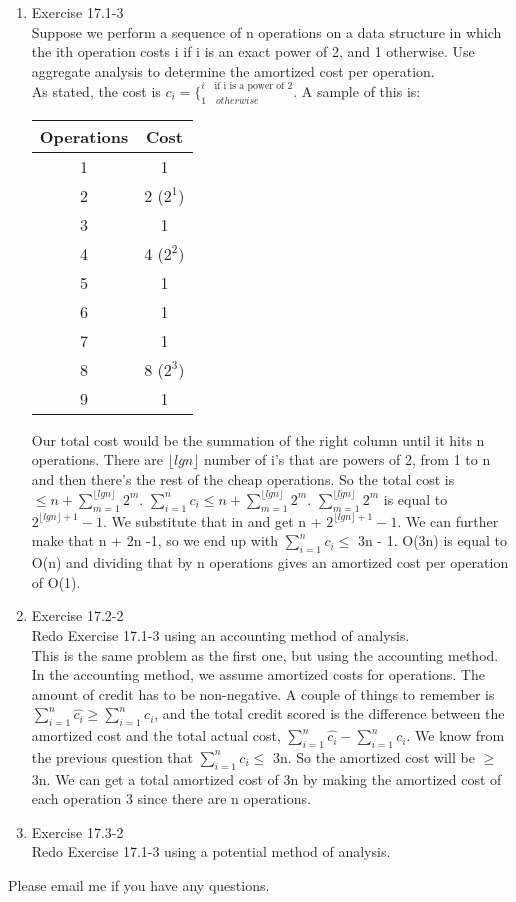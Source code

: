 \documentclass[12pt]{article}
\begin{document}
\begin{enumerate}
\item Exercise 17.1-3 \\
Suppose we perform a sequence of n operations on a data structure in which the ith operation costs i if i is an exact power of 2, and 1 otherwise. Use aggregate analysis to determine the amortized cost per operation. \\
As stated, the cost is $c_i=\{^{i\quad \textrm{if i is a power of 2}}_{1\quad otherwise}$. A sample of this is:
\begin{center}
 \begin{tabular}{|c c|} 
 \hline
 Operations & Cost\\ [0.5ex] 
 \hline
 1 & 1 \\ 
 \hline
 2 & 2 ($2^1$)  \\
 \hline
 3 & 1 \\
 \hline
 4 & 4 ($2^2$)\\
 \hline
 5 & 1 \\
 \hline
 6 & 1  \\ 
 \hline
 7 & 1 \\ 
 \hline
 8 & 8 ($2^3$)\\
 \hline
 9 & 1  \\
 \hline
\end{tabular}
\end{center}
Our total cost would be the summation of the right column until it hits n operations. There are $\lfloor lgn \rfloor$ number of i's that are powers of 2, from 1 to n and then there's the rest of the cheap operations. So the total cost is $\leq n + \sum_{m=1}^{\lfloor lgn \rfloor}2^m$. $\sum_{i=1}^nc_i \leq n + \sum_{m=1}^{\lfloor lgn \rfloor}2^m$. $\sum_{m=1}^{\lfloor lgn \rfloor}2^m$ is equal to $2^{\lfloor lgn \rfloor+1}-1$. We substitute that in and get n + $2^{\lfloor lgn \rfloor+1}-1$. We can further make that n + 2n -1, so we end up with $\sum_{i=1}^nc_i \leq$ 3n - 1. O(3n) is equal to O(n) and dividing that by n operations gives an amortized cost per operation of O(1).

\item Exercise 17.2-2 \\
Redo Exercise 17.1-3 using an accounting method of analysis. \\
This is the same problem as the first one, but using the accounting method. In the accounting method, we assume amortized costs for operations. The amount of credit has to be non-negative. A couple of things to remember is $\sum^n_{i=1}\hat{c_i} \geq \sum^n_{i=1}c_i$, and the total credit scored is the difference between the amortized cost and the total actual cost, $\sum^n_{i=1}\hat{c_i} - \sum^n_{i=1}c_i$. We know from the previous question that $\sum_{i=1}^nc_i \leq$ 3n. So the amortized cost will be $\geq$ 3n. We can get a total amortized cost of 3n by making the amortized cost of each operation 3 since there are n operations.

\item Exercise 17.3-2 \\
Redo Exercise 17.1-3 using a potential method of analysis.

\end{enumerate}
 
 
 Please email me if you have any questions.

 
\end{document}
